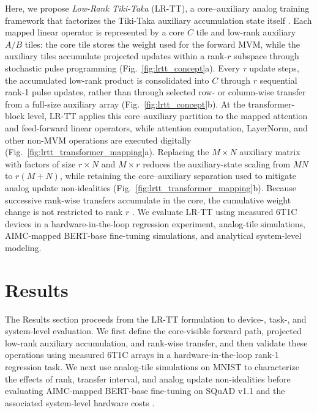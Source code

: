 \documentclass[fleqn,10pt]{wlscirep}
\begin{document}
\noindent
Here, we propose \emph{Low-Rank Tiki-Taka} (LR-TT), a core--auxiliary analog training framework that factorizes the Tiki-Taka auxiliary accumulation state itself \cite{gokmen2020tikitaka,gokmen2021ttv2}.
Each mapped linear operator is represented by a core \(C\) tile and low-rank auxiliary \(A/B\) tiles: the core tile stores the weight used for the forward MVM, while the auxiliary tiles accumulate projected updates within a rank-\(r\) subspace through stochastic pulse programming (Fig.~\ref{fig:lrtt_concept}a).
Every \(\tau\) update steps, the accumulated low-rank product is consolidated into \(C\) through \(r\) sequential rank-1 pulse updates, rather than through selected row- or column-wise transfer from a full-size auxiliary array (Fig.~\ref{fig:lrtt_concept}b).
At the transformer-block level, LR-TT applies this core--auxiliary partition to the mapped attention and feed-forward linear operators, while attention computation, LayerNorm, and other non-MVM operations are executed digitally (Fig.~\ref{fig:lrtt_transformer_mapping}a).
Replacing the \(M\times N\) auxiliary matrix with factors of size \(r\times N\) and \(M\times r\) reduces the auxiliary-state scaling from \(MN\) to \(r(M+N)\), while retaining the core--auxiliary separation used to mitigate analog update non-idealities (Fig.~\ref{fig:lrtt_transformer_mapping}b).
Because successive rank-wise transfers accumulate in the core, the cumulative weight change is not restricted to rank \(r\) \cite{lialin2023relora}.
We evaluate LR-TT using measured 6T1C devices in a hardware-in-the-loop regression experiment, analog-tile simulations, AIMC-mapped BERT-base fine-tuning simulations, and analytical system-level modeling.

\section{Results}
\label{sec:results}

\noindent
The Results section proceeds from the LR-TT formulation to device-, task-, and system-level evaluation.
We first define the core-visible forward path, projected low-rank auxiliary accumulation, and rank-wise transfer, and then validate these operations using measured 6T1C arrays in a hardware-in-the-loop rank-1 regression task.
We next use analog-tile simulations on MNIST to characterize the effects of rank, transfer interval, and analog update non-idealities before evaluating AIMC-mapped BERT-base fine-tuning on SQuAD v1.1 and the associated system-level hardware costs
\cite{lecun1998gradient,devlin2019bert,rajpurkar2016squad}.
\end{document}
